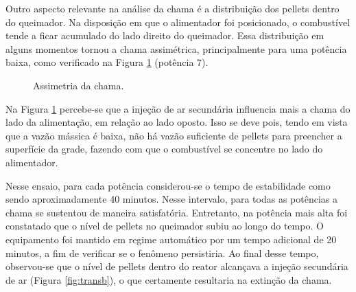 Outro aspecto relevante na análise da chama é a distribuição dos pellets dentro do queimador. Na disposição em que o alimentador foi posicionado, o combustível tende a ficar acumulado do lado direito do queimador. Essa distribuição em alguns momentos tornou a chama assimétrica, principalmente para uma potência baixa, como verificado na Figura \ref{fig:assimetria} (potência 7).

\begin{figure}
	\centering
	\caption{Assimetria da chama.}
	\label{fig:assimetria}
\end{figure}

\noindent Na Figura \ref{fig:assimetria} percebe-se que a injeção de ar secundária influencia mais a chama do lado da alimentação, em relação ao lado oposto. Isso se deve pois, tendo em vista que a vazão mássica é baixa, não há vazão suficiente de pellets para preencher a superfície da grade, fazendo com que o combustível se concentre no lado do alimentador.

Nesse ensaio, para cada potência considerou-se o tempo de estabilidade como sendo aproximadamente 40 minutos. Nesse intervalo, para todas as potências a chama se sustentou de maneira satisfatória. Entretanto, na potência mais alta foi constatado que o nível de pellets no queimador subiu ao longo do tempo. O equipamento foi mantido em regime automático por um tempo adicional de 20 minutos, a fim de verificar se o fenômeno persistiria. Ao final desse tempo, observou-se que o nível de pellets dentro do reator alcançava a injeção secundária de ar (Figura \ref{fig:transb}), o que certamente resultaria na extinção da chama. 


